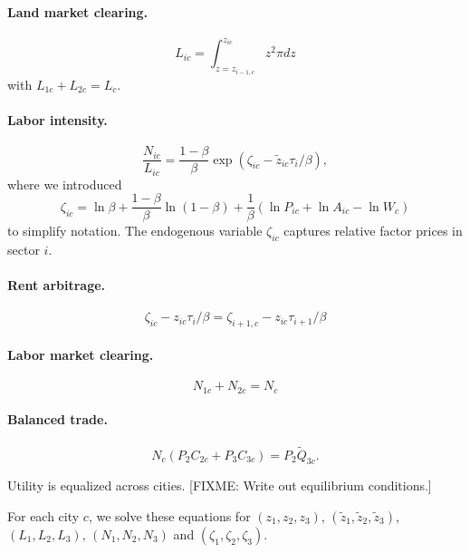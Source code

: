 \documentclass[12pt]{article}
\begin{document}
\paragraph{Land market clearing.}
\begin{equation}\label{eq:land_market_clearing}
	L_{ic}
	=
	\int_{z=z_{i-1,c}}^{z_{ic}}
		z^2\pi
		dz
\end{equation}
with $L_{1c}+L_{2c}=L_c$.

\paragraph{Labor intensity.}
\begin{equation}\label{eq:labor_intensity}
	\frac 	{N_{ic}}
			{L_{ic}}
	=
	\frac 	{1-\beta}
			{\beta}
	\exp(\zeta_{ic}-\tilde z_{ic} \tau_i/\beta),
\end{equation}
where we introduced
\[
\zeta_{ic}=\ln\beta + \frac{1-\beta}{\beta} \ln (1-\beta)
+ \frac 1{\beta} (\ln P_{ic} + \ln A_{ic} - \ln W_c)
\]
to simplify notation. The endogenous variable $\zeta_{ic}$ captures relative factor prices in sector $i$.

\paragraph{Rent arbitrage.}
\begin{equation}\label{eq:rent_arbitrage}
	\zeta_{ic} - z_{ic} \tau_i/\beta
	=
	\zeta_{i+1,c} - z_{ic} \tau_{i+1}/\beta
\end{equation}
\paragraph{Labor market clearing.}
\begin{equation}\label{eq:labor_market_clearing}
	N_{1c}+N_{2c} = N_c
\end{equation}
\paragraph{Balanced trade.}
\begin{equation}\label{eq:balanced_trade}
N_c(P_2C_{2c} + P_3 C_{3c}) = P_2 \tilde Q_{3c}.
\end{equation}
    \item Utility is equalized across cities. 
[FIXME: Write out equilibrium conditions.]

For each city $c$, we solve these equations for $(z_1,z_2,z_3)$, $(\tilde z_1,\tilde z_2,\tilde z_3)$, $(L_1,L_2,L_3)$, $(N_1,N_2,N_3)$ and $(\zeta_1,\zeta_2,\zeta_3)$.
\end{document}
